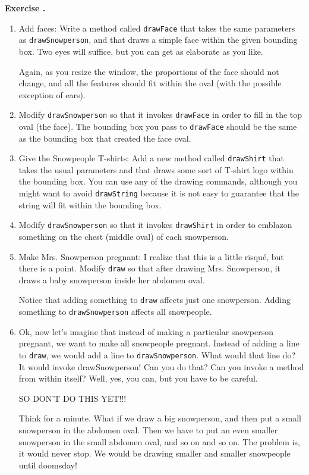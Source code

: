 \documentclass{book}
\newcounter{exercisenum}
\renewcommand{\theexercisenum}{{\thechapter}.\arabic{exercisenum}}
\newenvironment{exercisesize}{\begin{small}}{\end{small}}
\newcommand{\exerciseheader}[2]{                                          
     
  \begin{exercisesize}                                                    
     
     
  \def\theenumi{\alph{enumi}}                                             
  \def\labelenumi{\theenumi.}                                             
  \def\theenumii{\roman{enumii}}                                          
  \def\labelenumii{\theenumii.}                                           
  {\bf Exercise {#1}{#2}}\hspace{0.1in}                 
}
\newcommand{\startexercise}[1]{%
  \refstepcounter{exercisenum}                                            
  \exerciseheader{\theexercisenum}{#1}                                    
}
\newcommand{\stopexercise}{%
  {\hfill}                                                               
  \end{exercisesize}      
}
\newcommand{\normaldif}{}
\newenvironment{exercise}{\startexercise{\normaldif{}}}{\stopexercise}
\begin{document}
\begin{exercise}
\begin{enumerate}
\item Add faces: Write a method called {\tt drawFace} that takes the same
  parameters as {\tt drawSnowperson}, and that draws a simple face
  within the given bounding box.  Two eyes will suffice, but you can
  get as elaborate as you like.

Again, as you resize the window, the proportions of the face should
not change, and all the features should fit within the oval (with
the possible exception of ears).

\item Modify {\tt drawSnowperson} so that it invokes {\tt drawFace} in
order to fill in the top oval (the face).  The bounding box you pass
to {\tt drawFace} should be the same as the bounding box that created
the face oval.

\item Give the Snowpeople T-shirts:
Add a new method called {\tt drawShirt} that takes the usual
parameters and that draws some sort of T-shirt logo within
the bounding box.  You can use any of the drawing commands, although
you might want to avoid {\tt drawString} because it is not easy to
guarantee that the string will fit within the bounding box.

\item Modify {\tt drawSnowperson} so that it invokes {\tt drawShirt}
in order to emblazon something on the chest (middle
oval) of each snowperson.

\item Make Mrs. Snowperson pregnant: I realize that this is a little
  risqu\'{e}, but there is a point.  Modify {\tt draw} so that after
  drawing Mrs. Snowperson, it draws a baby snowperson inside her
  abdomen oval.

Notice that adding something to {\tt draw} affects just one snowperson.
Adding something to {\tt drawSnowperson} affects all snowpeople.

\item Ok, now let's imagine that instead of making a particular snowperson
pregnant, we want to make all snowpeople pregnant.  Instead of adding
a line to {\tt draw}, we would add a line to {\tt drawSnowperson}.
What would that line do?  It would invoke drawSnowperson!  Can you do
that?  Can you invoke a method from within itself?  Well, yes, you
can, but you have to be careful.

SO DON'T DO THIS YET!!!

Think for a minute.  What if we draw a big snowperson, and then put
a small snowperson in the abdomen oval.  Then we have to put an even
smaller snowperson in the small abdomen oval, and so on and so on.
The problem is, it would never stop.  We would be drawing smaller and
smaller snowpeople until doomsday!


\end{enumerate}
\end{exercise}
\end{document}
